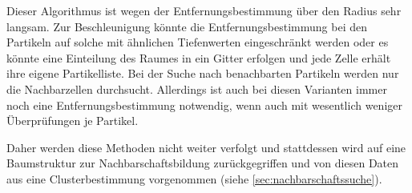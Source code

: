 Dieser Algorithmus ist wegen der Entfernungsbestimmung über den Radius sehr langsam. Zur Beschleunigung könnte die Entfernungsbestimmung bei den Partikeln auf solche mit ähnlichen Tiefenwerten eingeschränkt werden %
oder es könnte eine Einteilung des Raumes in ein Gitter erfolgen und jede Zelle erhält ihre eigene Partikelliste. Bei der Suche nach benachbarten Partikeln werden nur die Nachbarzellen durchsucht. Allerdings ist auch bei diesen Varianten immer noch eine Entfernungsbestimmung notwendig, wenn auch mit wesentlich weniger Überprüfungen je Partikel.

Daher werden diese Methoden nicht weiter verfolgt und stattdessen wird auf eine Baumstruktur zur Nachbarschaftsbildung zurückgegriffen und von diesen Daten aus eine Clusterbestimmung vorgenommen (siehe \autoref{sec:nachbarschaftssuche}).


\printbibliography[heading=bibintoc]\label{sec:bibliography}

\printindex %

